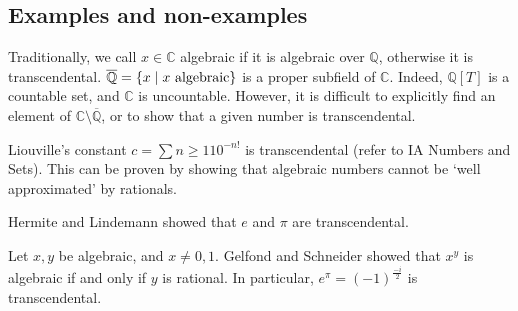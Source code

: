 \subsection{Examples and non-examples}
Traditionally, we call \( x \in \mathbb C \) algebraic if it is algebraic over \( \mathbb Q \), otherwise it is transcendental.
\( \overline{\mathbb Q} = \qty{x \mid x \text{ algebraic}} \) is a proper subfield of \( \mathbb C \).
Indeed, \( \mathbb Q[T] \) is a countable set, and \( \mathbb C \) is uncountable.
However, it is difficult to explicitly find an element of \( \mathbb C \setminus \overline{\mathbb Q} \), or to show that a given number is transcendental.
\begin{example}
	Liouville's constant \( c = \sum{n \geq 1} 10^{-n!} \) is transcendental (refer to IA Numbers and Sets).
	This can be proven by showing that algebraic numbers cannot be `well approximated' by rationals.
\end{example}
\begin{example}
	Hermite and Lindemann showed that \( e \) and \( \pi \) are transcendental.
\end{example}
\begin{example}
	Let \( x, y \) be algebraic, and \( x \neq 0,1 \).
	Gelfond and Schneider showed that \( x^y \) is algebraic if and only if \( y \) is rational.
	In particular, \( e^\pi = (-1)^{\frac{-i}{2}} \) is transcendental.
\end{example}
